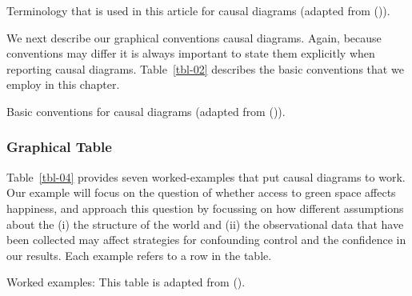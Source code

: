 \documentclass[
  singlecolumn]{article}
\begin{document}
\begin{table}

\caption{\label{tbl-01}Terminology that is used in this article for
causal diagrams (adapted from ()).}

\centering{

\terminologylocalconventionssimple

}

\end{table}%

We next describe our graphical conventions causal diagrams. Again,
because conventions may differ it is always important to state them
explicitly when reporting causal diagrams. Table~\ref{tbl-02} describes
the basic conventions that we employ in this chapter.

\begin{table}

\caption{\label{tbl-02}Basic conventions for causal diagrams (adapted
from ()).}

\centering{

\terminologygeneralbasic

}

\end{table}%

\subsubsection{Graphical Table}\label{graphical-table}

Table~\ref{tbl-04} provides seven worked-examples that put causal
diagrams to work. Our example will focus on the question of whether
access to green space affects happiness, and approach this question by
focussing on how different assumptions about the (i) the structure of
the world and (ii) the observational data that have been collected may
affect strategies for confounding control and the confidence in our
results. Each example refers to a row in the table.

\begin{table}

\caption{\label{tbl-04}Worked examples: This table is adapted from
().}

\centering{

\terminologyelconfoundersLONG

}

\end{table}%
\end{document}
